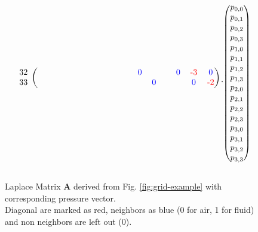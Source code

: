 \begin{figure*}
\[\begin{blockarray}{ccccccccccccccccc}
\begin{block}{c(cccccccccccccccc)}
		32 & & & & & & & & & & & \textcolor{blue}{0} & & & \textcolor{blue}{0} & \textcolor{red}{\text{-}3} & \textcolor{blue}{0}  \\
		33 & & & & & & & & & & & & \textcolor{blue}{0} & & & \textcolor{blue}{0} & \textcolor{red}{\text{-}2} \\
	\end{block}
	\end{blockarray}
	\cdot 
	\begin{blockarray}{c}
	\\
	\begin{block}{(c)}
		p_{0,0} \\
		p_{0,1} \\
		p_{0,2} \\
		p_{0,3} \\
		p_{1,0} \\
		p_{1,1} \\
		p_{1,2} \\
		p_{1,3} \\
		p_{2,0} \\
		p_{2,1} \\
		p_{2,2} \\
		p_{2,3} \\
		p_{3,0} \\
		p_{3,1} \\
		p_{3,2} \\
		p_{3,3} \\
	\end{block}
	\end{blockarray}
\]
\caption{Laplace Matrix \textbf{A} derived from Fig. \ref{fig:grid-example} with corresponding pressure vector.\\
Diagonal are marked as red, neighbors as blue (0 for air, 1 for fluid) and non neighbors are left out (0).}\label{fig:laplace-matrix}
\end{figure*}



